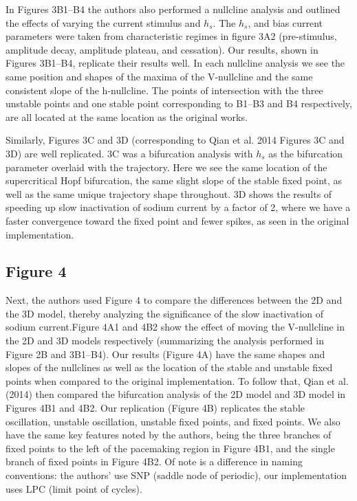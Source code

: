 In Figures 3B1--B4 the authors also performed a nullcline analysis and outlined the effects of varying the current stimulus and $h_s$. The $h_s$, and bias current parameters were taken from characteristic regimes in figure 3A2 (pre-stimulus, amplitude decay, amplitude plateau, and cessation). Our results, shown in Figures 3B1--B4, replicate their results well. In each nullcline analysis we see the same position and shapes of the maxima of the V-nullcline and the same consistent slope of the h-nullcline. The points of intersection with the three unstable points and one stable point corresponding to B1--B3 and B4 respectively, are all located at the same location as the original works. 

Similarly, Figures 3C and 3D (corresponding to Qian et al. 2014 Figures 3C and 3D) are well replicated. 3C was a bifurcation analysis with $h_s$ as the bifurcation parameter overlaid with the trajectory. Here we see the same location of the supercritical Hopf bifurcation, the same slight slope of the stable fixed point, as well as the same unique trajectory shape throughout. 3D shows the results of speeding up slow inactivation of sodium current by a factor of 2, where we have a faster convergence toward the fixed point and fewer spikes, as seen in the original implementation.



\subsection{Figure 4}
Next, the authors used Figure 4 to compare the differences between the 2D and the 3D model, thereby analyzing the significance of the slow inactivation of sodium current.Figure 4A1 and 4B2 show the effect of moving the V-nullcline in the 2D and 3D models respectively (summarizing the analysis performed in Figure 2B and 3B1--B4). Our results (Figure 4A) have the same shapes and slopes of the nullclines as well as the location of the stable and unstable fixed points when compared to the original implementation. To follow that, Qian et al. (2014) then compared the bifurcation analysis of the 2D model and 3D model in Figures 4B1 and 4B2. Our replication (Figure 4B) replicates the stable oscillation, unstable oscillation, unstable fixed points, and fixed points. We also have the same key features noted by the authors, being the three branches of fixed points to the left of the pacemaking region in Figure 4B1, and the single branch of fixed points in Figure 4B2. Of note is a difference in naming conventions: the authors' use SNP (saddle node of periodic), our implementation uses LPC (limit point of cycles).

